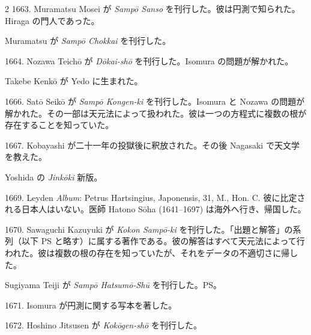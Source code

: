 \documentclass[11pt]{article}
\newcommand{\scanfooter}{}
\begin{document}
\begin{multicols}{2}
1663. Muramatsu Mosei が \emph{Sampō Sanso} を刊行した。彼は円測で知られた。Hiraga の門人であった。

Muramatsu が \emph{Sampō Chokkai} を刊行した。

1664. Nozawa Teichō が \emph{Dōkai-shō} を刊行した。Isomura の問題が解かれた。

Takebe Kenkō が Yedo に生まれた。

1666. Satō Seikō が \emph{Sampō Kongen-ki} を刊行した。Isomura と Nozawa の問題が解かれた。その一部は天元法によって扱われた。彼は一つの方程式に複数の根が存在することを知っていた。

1667. Kobayashi が二十一年の投獄後に釈放された。その後 Nagasaki で天文学を教えた。

Yoshida の \emph{Jinkōki} 新版。

1669. Leyden \emph{Album}: Petrus Hartsingius, Japonensis, 31, M., Hon. C. 彼に比定される日本人はいない。医師 Hatono Sōha (1641--1697) は海外へ行き、帰国した。

1670. Sawaguchi Kazuyuki が \emph{Kokon Sampō-ki} を刊行した。「出題と解答」の系列（以下 PS と略す）に属する著作である。彼の解答はすべて天元法によって行われた。彼は複数の根の存在を知っていたが、それをデータの不適切さに帰した。

Sugiyama Teiji が \emph{Sampō Hatsumō-Shū} を刊行した。PS。

1671. Isomura が円測に関する写本を著した。

1672. Hoshino Jitsusen が \emph{Kokōgen-shō} を刊行した。
\end{multicols}
\scanfooter
\end{document}
